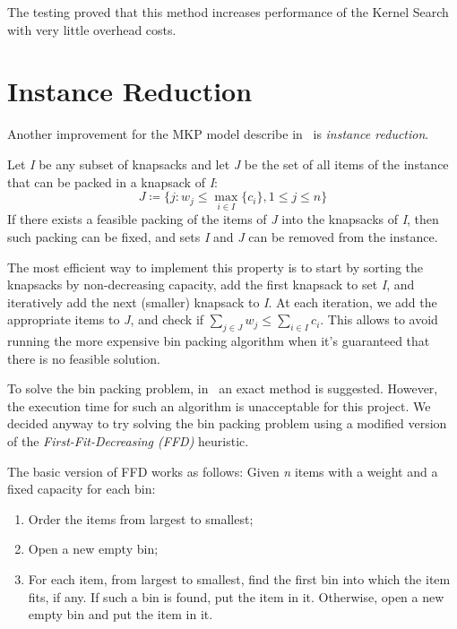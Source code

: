 The testing proved that this method increases performance of the Kernel Search with very little
overhead costs.


\section{Instance Reduction}
Another improvement for the MKP model describe in~\cite{mkp:2019} is
\textit{instance reduction}.

Let \textit{I} be any subset of knapsacks and let \textit{J} be the set of
all items of the instance that can be packed in a knapsack of \textit{I}:
\begin{equation}
    J \coloneqq \{j:w_{j} \leq \max_{i \in I} \{c_{i}\}, 1 \leq j \leq n\}
\end{equation}
If there exists a feasible packing of the items of \textit{J} into the knapsacks
of \textit{I}, then such packing can be fixed, and sets \textit{I} and \textit{J}
can be removed from the instance.

The most efficient way to implement this property is to start
by sorting the knapsacks by non-decreasing capacity, add the first knapsack
to set \textit{I}, and iteratively add the next (smaller) knapsack to \textit{I}.
At each iteration, we add the appropriate items to \textit{J},
and check if \(\sum_{j \in J} w_{j} \leq \sum_{i \in I} c_{i}\).
This allows to avoid running the more expensive bin packing algorithm
when it's guaranteed that there is no feasible solution.

To solve the bin packing problem, in~\cite{mkp:2019} an exact method is suggested.
However, the execution time for such an algorithm is unacceptable for this project.
We decided anyway to try solving the bin packing problem using a modified
version of the \textit{First-Fit-Decreasing (FFD)} heuristic.

The basic version of FFD works as follows:
Given \textit{n} items with a weight and a fixed capacity for each bin:
\begin{enumerate}
    \item Order the items from largest to smallest;
    \item Open a new empty bin;
    \item For each item, from largest to smallest, find the first bin into which the item fits, if any.
    If such a bin is found, put the item in it.
    Otherwise, open a new empty bin and put the item in it.
\end{enumerate}

